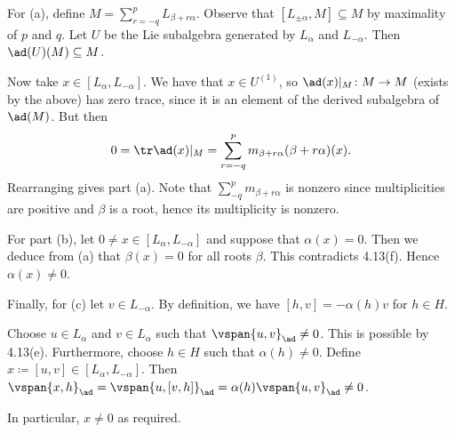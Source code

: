 For (a), define $M = \sum_{r=-q}^p L_{\beta + r\alpha}$. Observe that
$[L_{\pm\alpha}, M] \subseteq M$ by maximality of $p$ and $q$.
Let $U$ be the Lie subalgebra generated by $L_{\alpha}$ and $L_{-\alpha}$.
Then $\ad(U)(M) \subseteq M$.

Now take $x \in [L_\alpha, L_{-\alpha}]$. We have that $x \in U^{(1)}$, so
$\ad(x)|_M\colon M\to M$ (exists by the above) has zero trace,
since it is an element of the derived subalgebra of $\ad(M)$. But then
\[ 0 = \tr \ad(x)|_M = \sum_{r=-q}^p m_{\beta + r\alpha}(\beta + r\alpha)(x). \]
Rearranging gives part (a). Note that $\sum_{-q}^p m_{\beta+r\alpha}$ is nonzero
since multiplicities are positive and $\beta$ is a root, hence its multiplicity
is nonzero.

For part (b), let $0\neq x \in [L_\alpha, L_{-\alpha}]$ and suppose that
$\alpha(x) = 0$. Then we deduce from (a) that $\beta(x) = 0$ for all
roots $\beta$. This contradicts 4.13(f). Hence $\alpha(x)\neq 0$.

Finally, for (c) let $v \in L_{-\alpha}$. By definition, we have
$[h, v] = -\alpha(h)v$ for $h \in H$.

Choose $u \in L_\alpha$ and $v \in L_{\alpha}$ such that $\vspan{u, v}_{\ad} \neq 0$.
This is possible by 4.13(e). Furthermore, choose $h \in H$ such that $\alpha(h)\neq 0$.
Define $x\coloneqq[u, v] \in [L_\alpha, L_{-\alpha}]$. Then
$\vspan{x, h}_{\ad} = \vspan{u, [v, h]}_{\ad} = \alpha(h)\vspan{u, v}_{\ad} \neq 0$.

In particular, $x\neq 0$ as required.
